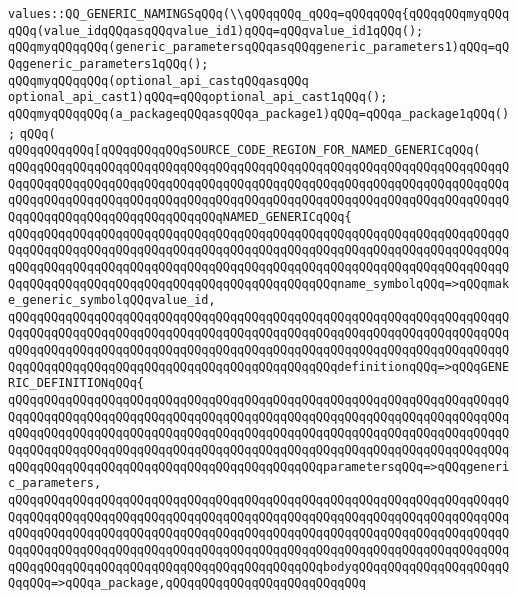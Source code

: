 \verb|values::QQ_GENERIC_NAMINGSqQQq(\\qQQqqQQq_qQQq=qQQqqQQq{qQQqqQQqmyqQQqqQQq(value_idqQQqasqQQqvalue_id1)qQQq=qQQqvalue_id1qQQq();|\newline
\verb|qQQqmyqQQqqQQq(generic_parametersqQQqasqQQqgeneric_parameters1)qQQq=qQQqgeneric_parameters1qQQq();|\newline
\verb|qQQqmyqQQqqQQq(optional_api_castqQQqasqQQq|\newline
\verb|optional_api_cast1)qQQq=qQQqoptional_api_cast1qQQq();|\newline
\verb|qQQqmyqQQqqQQq(a_packageqQQqasqQQqa_package1)qQQq=qQQqa_package1qQQq();|\newline
\verb|qQQq(|\newline
\verb|qQQqqQQqqQQq[qQQqqQQqqQQqSOURCE_CODE_REGION_FOR_NAMED_GENERICqQQq(|\newline
\verb|qQQqqQQqqQQqqQQqqQQqqQQqqQQqqQQqqQQqqQQqqQQqqQQqqQQqqQQqqQQqqQQqqQQqqQQqqQQqqQQqqQQqqQQqqQQqqQQqqQQqqQQqqQQqqQQqqQQqqQQqqQQqqQQqqQQqqQQqqQQqqQQqqQQqqQQqqQQqqQQqqQQqqQQqqQQqqQQqqQQqqQQqqQQqqQQqqQQqqQQqqQQqqQQqqQQqqQQqqQQqqQQqqQQqqQQqqQQqqQQqNAMED_GENERICqQQq{|\newline
\verb|qQQqqQQqqQQqqQQqqQQqqQQqqQQqqQQqqQQqqQQqqQQqqQQqqQQqqQQqqQQqqQQqqQQqqQQqqQQqqQQqqQQqqQQqqQQqqQQqqQQqqQQqqQQqqQQqqQQqqQQqqQQqqQQqqQQqqQQqqQQqqQQqqQQqqQQqqQQqqQQqqQQqqQQqqQQqqQQqqQQqqQQqqQQqqQQqqQQqqQQqqQQqqQQqqQQqqQQqqQQqqQQqqQQqqQQqqQQqqQQqqQQqqQQqqQQqqQQqname_symbolqQQq=>qQQqmake_generic_symbolqQQqvalue_id,|\newline
\verb|qQQqqQQqqQQqqQQqqQQqqQQqqQQqqQQqqQQqqQQqqQQqqQQqqQQqqQQqqQQqqQQqqQQqqQQqqQQqqQQqqQQqqQQqqQQqqQQqqQQqqQQqqQQqqQQqqQQqqQQqqQQqqQQqqQQqqQQqqQQqqQQqqQQqqQQqqQQqqQQqqQQqqQQqqQQqqQQqqQQqqQQqqQQqqQQqqQQqqQQqqQQqqQQqqQQqqQQqqQQqqQQqqQQqqQQqqQQqqQQqqQQqqQQqqQQqqQQqdefinitionqQQq=>qQQqGENERIC_DEFINITIONqQQq{|\newline
\verb|qQQqqQQqqQQqqQQqqQQqqQQqqQQqqQQqqQQqqQQqqQQqqQQqqQQqqQQqqQQqqQQqqQQqqQQqqQQqqQQqqQQqqQQqqQQqqQQqqQQqqQQqqQQqqQQqqQQqqQQqqQQqqQQqqQQqqQQqqQQqqQQqqQQqqQQqqQQqqQQqqQQqqQQqqQQqqQQqqQQqqQQqqQQqqQQqqQQqqQQqqQQqqQQqqQQqqQQqqQQqqQQqqQQqqQQqqQQqqQQqqQQqqQQqqQQqqQQqqQQqqQQqqQQqqQQqqQQqqQQqqQQqqQQqqQQqqQQqqQQqqQQqqQQqqQQqqQQqqQQqqQQqparametersqQQq=>qQQqgeneric_parameters,|\newline
\verb|qQQqqQQqqQQqqQQqqQQqqQQqqQQqqQQqqQQqqQQqqQQqqQQqqQQqqQQqqQQqqQQqqQQqqQQqqQQqqQQqqQQqqQQqqQQqqQQqqQQqqQQqqQQqqQQqqQQqqQQqqQQqqQQqqQQqqQQqqQQqqQQqqQQqqQQqqQQqqQQqqQQqqQQqqQQqqQQqqQQqqQQqqQQqqQQqqQQqqQQqqQQqqQQqqQQqqQQqqQQqqQQqqQQqqQQqqQQqqQQqqQQqqQQqqQQqqQQqqQQqqQQqqQQqqQQqqQQqqQQqqQQqqQQqqQQqqQQqqQQqqQQqqQQqqQQqqQQqqQQqqQQqbodyqQQqqQQqqQQqqQQqqQQqqQQqqQQq=>qQQqa_package,qQQqqQQqqQQqqQQqqQQqqQQqqQQq|\newline
